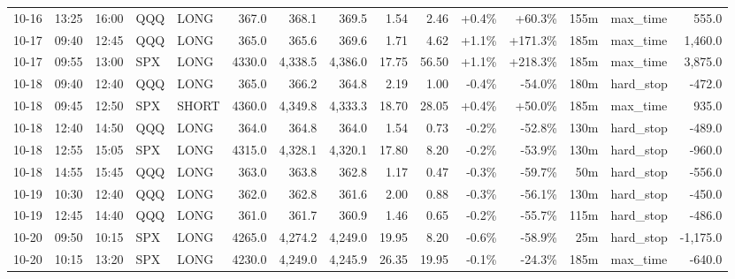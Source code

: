 \documentclass[11pt,a4paper,twoside]{article}
\begin{document}
\begin{landscape}
\begin{center}
\begin{longtable}{>{\color{txtmain}}l l l l l r r r r r r r r >{\color{txtmain}}l r}
10-16 & 13:25 & 16:00 & QQQ & LONG & 367.0 & 368.1 & 369.5 & 1.54 & 2.46 & \textcolor{wingreen}{+0.4\%} & \textcolor{wingreen}{+60.3\%} & 155m & max\_time & \textcolor{wingreen}{555.0} \\
10-17 & 09:40 & 12:45 & QQQ & LONG & 365.0 & 365.6 & 369.6 & 1.71 & 4.62 & \textcolor{wingreen}{+1.1\%} & \textcolor{wingreen}{+171.3\%} & 185m & max\_time & \textcolor{wingreen}{1,460.0} \\
10-17 & 09:55 & 13:00 & SPX & LONG & 4330.0 & 4,338.5 & 4,386.0 & 17.75 & 56.50 & \textcolor{wingreen}{+1.1\%} & \textcolor{wingreen}{+218.3\%} & 185m & max\_time & \textcolor{wingreen}{3,875.0} \\
10-18 & 09:40 & 12:40 & QQQ & LONG & 365.0 & 366.2 & 364.8 & 2.19 & 1.00 & \textcolor{lossred}{-0.4\%} & \textcolor{lossred}{-54.0\%} & 180m & hard\_stop & \textcolor{lossred}{-472.0} \\
10-18 & 09:45 & 12:50 & SPX & SHORT & 4360.0 & 4,349.8 & 4,333.3 & 18.70 & 28.05 & \textcolor{wingreen}{+0.4\%} & \textcolor{wingreen}{+50.0\%} & 185m & max\_time & \textcolor{wingreen}{935.0} \\
10-18 & 12:40 & 14:50 & QQQ & LONG & 364.0 & 364.8 & 364.0 & 1.54 & 0.73 & \textcolor{lossred}{-0.2\%} & \textcolor{lossred}{-52.8\%} & 130m & hard\_stop & \textcolor{lossred}{-489.0} \\
10-18 & 12:55 & 15:05 & SPX & LONG & 4315.0 & 4,328.1 & 4,320.1 & 17.80 & 8.20 & \textcolor{lossred}{-0.2\%} & \textcolor{lossred}{-53.9\%} & 130m & hard\_stop & \textcolor{lossred}{-960.0} \\
10-18 & 14:55 & 15:45 & QQQ & LONG & 363.0 & 363.8 & 362.8 & 1.17 & 0.47 & \textcolor{lossred}{-0.3\%} & \textcolor{lossred}{-59.7\%} & 50m & hard\_stop & \textcolor{lossred}{-556.0} \\
10-19 & 10:30 & 12:40 & QQQ & LONG & 362.0 & 362.8 & 361.6 & 2.00 & 0.88 & \textcolor{lossred}{-0.3\%} & \textcolor{lossred}{-56.1\%} & 130m & hard\_stop & \textcolor{lossred}{-450.0} \\
10-19 & 12:45 & 14:40 & QQQ & LONG & 361.0 & 361.7 & 360.9 & 1.46 & 0.65 & \textcolor{lossred}{-0.2\%} & \textcolor{lossred}{-55.7\%} & 115m & hard\_stop & \textcolor{lossred}{-486.0} \\
10-20 & 09:50 & 10:15 & SPX & LONG & 4265.0 & 4,274.2 & 4,249.0 & 19.95 & 8.20 & \textcolor{lossred}{-0.6\%} & \textcolor{lossred}{-58.9\%} & 25m & hard\_stop & \textcolor{lossred}{-1,175.0} \\
10-20 & 10:15 & 13:20 & SPX & LONG & 4230.0 & 4,249.0 & 4,245.9 & 26.35 & 19.95 & \textcolor{lossred}{-0.1\%} & \textcolor{lossred}{-24.3\%} & 185m & max\_time & \textcolor{lossred}{-640.0} \\

\end{longtable}
\end{center}
\end{landscape}
\end{document}
